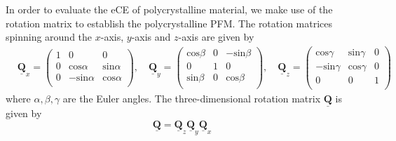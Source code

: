 \documentclass[reprint,3p,sort&compress,times,onecolumn]{elsarticle}
\begin{document}
In order to evaluate the eCE of polycrystalline material, we make use of the rotation matrix to establish the polycrystalline PFM. 
The rotation matrices spinning around the $x$-axis, $y$-axis and $z$-axis are given by
\begin{equation}
\begin{split}
&\underline{\mathbf{Q}}_x =
\left(             
\begin{array}{ccc}  
1& 0  & 0 \\
0& \text{cos}\alpha & \text{sin}\alpha \\
0 & -\text{sin}\alpha & \text{cos}\alpha \\
\end{array}
\right), \quad
 \underline{\mathbf{Q}}_y=
\left(             
\begin{array}{ccc}  
\text{cos}\beta & 0  & -\text{sin}\beta \\
0 & 1 & 0 \\
\text{sin}\beta  & 0 & \text{cos}\beta \\
\end{array}
\right), \quad
\underline{\mathbf{Q}}_z=
\left(             
\begin{array}{ccc}  
\text{cos}\gamma & \text{sin}\gamma  & 0 \\
-\text{sin}\gamma & \text{cos}\gamma & 0 \\
0 & 0 & 1 \\
\end{array}
\right) 
\end{split} \label{eq17}
\end{equation}
where $\alpha, \beta, \gamma$ are the Euler angles. The three-dimensional rotation matrix $\underline{\mathbf{Q}}$ is given by
\begin{equation}
\underline{\mathbf{Q}}=\underline{\mathbf{Q}}_z\underline{\mathbf{Q}}_y\underline{\mathbf{Q}}_x
\end{equation}
\end{document}

